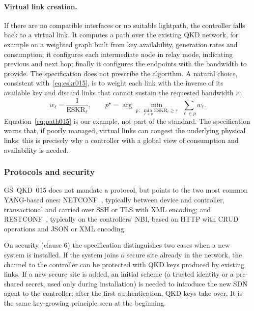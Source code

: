 \paragraph{Virtual link creation.}
If there are no compatible interfaces or no suitable lightpath, the
controller falls back to a virtual link. It computes a path over the
existing QKD network, for example on a weighted graph built from key
availability, generation rates and consumption; it configures each
intermediate node in relay mode, indicating previous and next hop; finally
it configures the endpoints with the bandwidth to provide. The
specification does not prescribe the algorithm. A natural choice,
consistent with~\eqref{eq:eskr015}, is to weight each link with the inverse
of its available key and discard links that cannot sustain the requested
bandwidth $r$:
\begin{equation}
  w_\ell = \frac{1}{\mathrm{ESKR}_\ell}, \qquad
  p^\star = \arg\min_{p\,:\,\min_{\ell\in p}\mathrm{ESKR}_\ell \ge r}
            \;\sum_{\ell\in p} w_\ell .
  \label{eq:path015}
\end{equation}
Equation~\eqref{eq:path015} is our example, not part of the standard. The
specification warns that, if poorly managed, virtual links can congest the
underlying physical links: this is precisely why a controller with a global
view of consumption and availability is needed.

\subsubsection{Protocols and security}

GS~QKD~015 does not mandate a protocol, but points to the two most common
YANG-based ones: NETCONF~\cite{rfc6241}, typically between device and
controller, transactional and carried over SSH or TLS with XML encoding;
and RESTCONF~\cite{rfc8040}, typically on the controllers' NBI, based on
HTTP with CRUD operations and JSON or XML encoding.

On security (clause 6) the specification distinguishes two cases when a new
system is installed. If the system joins a secure site already in the
network, the channel to the controller can be protected with QKD keys
produced by existing links. If a new secure site is added, an initial
scheme (a trusted identity or a pre-shared secret, used only during
installation) is needed to introduce the new SDN agent to the controller;
after the first authentication, QKD keys take over. It is the same
key-growing principle seen at the beginning.

